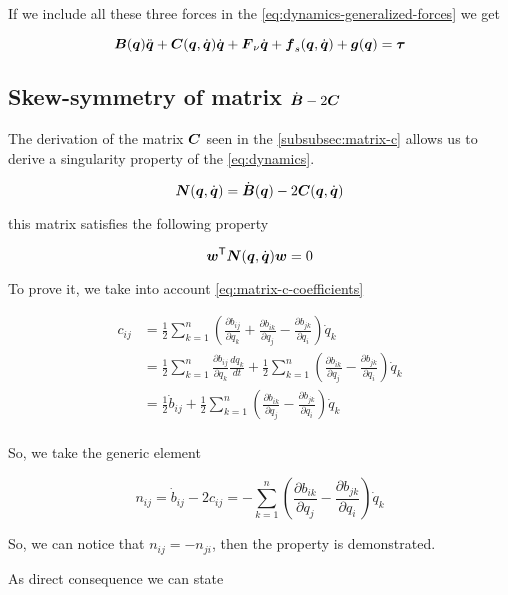If we include all these three forces in the \autoref{eq:dynamics-generalized-forces} we get

\begin{equation}
	\boldsymbol{B}(\boldsymbol{q})\ddot{\boldsymbol{q}} + \boldsymbol{C}(\boldsymbol{q},\dot{\boldsymbol{q}})\dot{\boldsymbol{q}} + \boldsymbol{F}_\nu\dot{\boldsymbol{q}} + \boldsymbol{f}_s(\boldsymbol{q},\dot{\boldsymbol{q}}) + \boldsymbol{g}(\boldsymbol{q}) = \boldsymbol{\tau} \label{eq:dynamics}
\end{equation}

\subsection{Skew-symmetry of matrix \texorpdfstring{$\dot{\boldsymbol{B}} - 2\boldsymbol{C}$}{dB-2C}}\label{subsec:matrix-db-2c}

The derivation of the matrix $\boldsymbol{C}$ seen in the \autoref{subsubsec:matrix-c} allows us to derive a singularity property of the \autoref{eq:dynamics}.

\[ \boldsymbol{N}(\boldsymbol{q},\dot{\boldsymbol{q}}) = \dot{\boldsymbol{B}}(\boldsymbol{q}) - 2 \boldsymbol{C}(\boldsymbol{q},\dot{\boldsymbol{q}}) \]

this matrix satisfies the following property

\[ \boldsymbol{w}^{\mathsf{T}} \boldsymbol{N}(\boldsymbol{q},\dot{\boldsymbol{q}}) \boldsymbol{w} = 0 \]

To prove it, we take into account \autoref{eq:matrix-c-coefficients}

\begin{align*}
    c_{ij} &= \frac{1}{2} \sum_{k=1}^n  \left( \frac{\partial b_{ij}}{\partial q_k} + \frac{\partial b_{ik}}{\partial q_j} - \frac{\partial b_{jk}}{\partial q_i} \right)\dot{q}_k \\
	&= \frac{1}{2} \sum_{k=1}^n \frac{\partial b_{ij}}{\partial q_k} \frac{d q_k}{dt} +
    \frac{1}{2} \sum_{k=1}^n \left( \frac{\partial b_{ik}}{\partial q_j} - \frac{\partial b_{jk}}{\partial q_i} \right) \dot{q}_k \\
    &= \frac{1}{2} \dot{b}_{ij} +
    \frac{1}{2} \sum_{k=1}^n \left( \frac{\partial b_{ik}}{\partial q_j} - \frac{\partial b_{jk}}{\partial q_i} \right) \dot{q}_k \\
\end{align*}

So, we take the generic element

\[
	n_{ij} = \dot{b}_{ij} - 2 c_{ij} = - \sum_{k=1}^n \left( \frac{\partial b_{ik}}{\partial q_j} - \frac{\partial b_{jk}}{\partial q_i} \right) \dot{q}_k
\]

So, we can notice that  $n_{ij} = - n_{ji}$, then the property is demonstrated.

As direct consequence we can state

